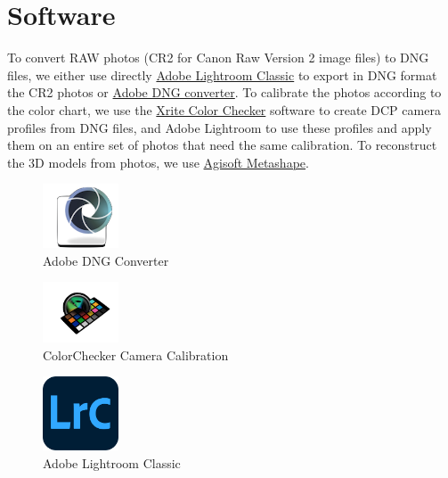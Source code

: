 \documentclass[
]{book}
\begin{document}
\hypertarget{software}{%
\section{Software}\label{software}}

To convert RAW photos (CR2 for Canon Raw Version 2 image files) to DNG
files, we either use directly \href{https://www.adobe.com/ca_fr/products/photoshop-lightroom-classic.html}{Adobe Lightroom
Classic}
to export in DNG format the CR2 photos or \href{https://helpx.adobe.com/camera-raw/using/adobe-dng-converter.html}{Adobe DNG
converter}.
To calibrate the photos according to the color chart, we use the \href{https://xritephoto.com/ph_product_overview.aspx?ID=938\&Action=Support\&SoftwareID=2030}{Xrite
Color
Checker}
software to create DCP camera profiles from DNG files, and Adobe
Lightroom to use these profiles and apply them on an entire set of
photos that need the same calibration. To reconstruct the 3D models from
photos, we use \href{https://www.agisoft.com/downloads/installer/}{Agisoft
Metashape}.

\begin{figure}
\centering
\includegraphics[width=0.2\textwidth,height=\textheight]{Figures/logo Adobe DNG Converter.png}
\caption{Adobe DNG
Converter}
\end{figure}

\begin{figure}
\centering
\includegraphics[width=0.2\textwidth,height=\textheight]{Figures/logo ColorChecker Camera Calibration.png}
\caption{ColorChecker Camera
Calibration}
\end{figure}

\begin{figure}
\centering
\includegraphics[width=0.2\textwidth,height=\textheight]{Figures/logo Lrc.png}
\caption{Adobe Lightroom Classic}
\end{figure}
\end{document}
